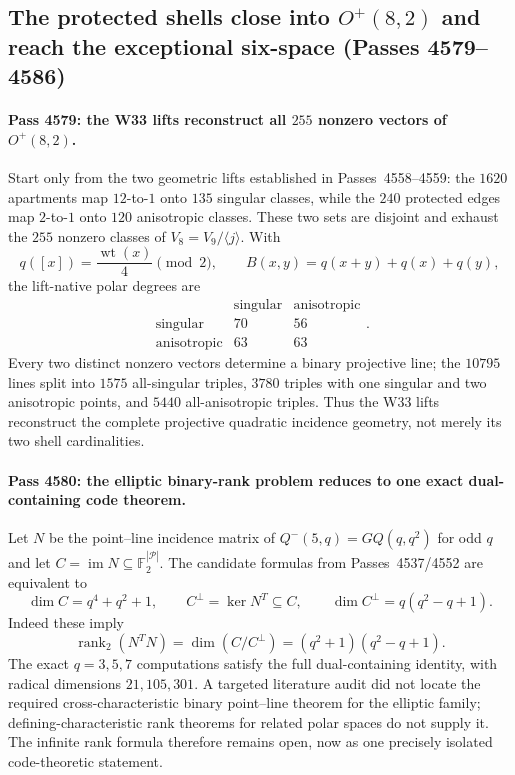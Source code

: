 \subsection{The protected shells close into $O^+(8,2)$ and reach the exceptional six-space (Passes 4579--4586)}
\label{sec:pass4579-4586-o8plus-exceptional}

\paragraph{Pass 4579: the W33 lifts reconstruct all $255$ nonzero vectors of $O^+(8,2)$.}
Start only from the two geometric lifts established in Passes~4558--4559: the
$1620$ apartments map $12$-to-$1$ onto $135$ singular classes, while the $240$
protected edges map $2$-to-$1$ onto $120$ anisotropic classes.  These two sets
are disjoint and exhaust the $255$ nonzero classes of
$V_8=V_9/\langle j\rangle$.  With
\[
 q([x])=\frac{\operatorname{wt}(x)}4\pmod2,\qquad
 B(x,y)=q(x+y)+q(x)+q(y),
\]
the lift-native polar degrees are
\[
\begin{array}{c|cc}
 &\text{singular}&\text{anisotropic}\\ \hline
\text{singular}&70&56\\
\text{anisotropic}&63&63
\end{array}.
\]
Every two distinct nonzero vectors determine a binary projective line; the
$10795$ lines split into $1575$ all-singular triples, $3780$ triples with one
singular and two anisotropic points, and $5440$ all-anisotropic triples.  Thus
the W33 lifts reconstruct the complete projective quadratic incidence geometry,
not merely its two shell cardinalities.

\paragraph{Pass 4580: the elliptic binary-rank problem reduces to one exact dual-containing code theorem.}
Let $N$ be the point--line incidence matrix of
$Q^-(5,q)=GQ(q,q^2)$ for odd $q$ and let
$C=\operatorname{im}N\subseteq\mathbb F_2^{|\mathcal P|}$.  The candidate formulas
from Passes~4537/4552 are equivalent to
\[
 \dim C=q^4+q^2+1,\qquad
 C^\perp=\ker N^T\subseteq C,\qquad
 \dim C^\perp=q(q^2-q+1).
\]
Indeed these imply
\[
 \boxed{\operatorname{rank}_2(N^TN)
       =\dim(C/C^\perp)=(q^2+1)(q^2-q+1).}
\]
The exact $q=3,5,7$ computations satisfy the full dual-containing identity,
with radical dimensions $21,105,301$.  A targeted literature audit did not
locate the required cross-characteristic binary point--line theorem for the
elliptic family; defining-characteristic rank theorems for related polar spaces
do not supply it.  The infinite rank formula therefore remains open, now as one
precisely isolated code-theoretic statement.

